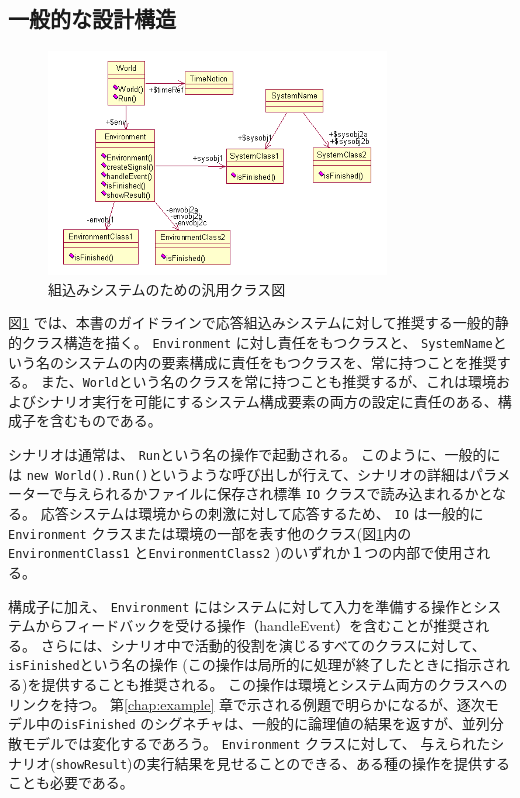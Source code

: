 \documentclass[\pformat,12pt]{jreport}
\begin{document}
\subsection{一般的な設計構造}\label{sec:typicalclassdiag}

\begin{figure}
\begin{center}
\includegraphics[width=0.8\textwidth]{generalclassdiag}
\end{center}
\caption{組込みシステムのための汎用クラス図}\label{fig:classdiag}
\end{figure}

図\ref{fig:classdiag} では、本書のガイドラインで応答組込みシステムに対して推奨する一般的静的クラス構造を描く。
\texttt{Environment} に対し責任をもつクラスと、 \texttt{SystemName}という名のシステムの内の要素構成に責任をもつクラスを、常に持つことを推奨する。
また、\texttt{World}という名のクラスを常に持つことも推奨するが、これは環境およびシナリオ実行を可能にするシステム構成要素の両方の設定に責任のある、構成子を含むものである。

シナリオは通常は、 \texttt{Run}という名の操作で起動される。
このように、一般的には \texttt{new World().Run()}というような呼び出しが行えて、シナリオの詳細はパラメーターで与えられるかファイルに保存され標準 \texttt{IO} クラスで読み込まれるかとなる。
応答システムは環境からの刺激に対して応答するため、 \texttt{IO} は一般的に \texttt{Environment} クラスまたは環境の一部を表す他のクラス(図\ref{fig:classdiag}内の\texttt{EnvironmentClass1} と\texttt{EnvironmentClass2} )のいずれか１つの内部で使用される。

構成子に加え、 \texttt{Environment} にはシステムに対して入力を準備する操作とシステムからフィードバックを受ける操作（handleEvent）を含むことが推奨される。
さらには、シナリオ中で活動的役割を演じるすべてのクラスに対して、 \texttt{isFinished}という名の操作 (この操作は局所的に処理が終了したときに指示される)を提供することも推奨される。
この操作は環境とシステム両方のクラスへのリンクを持つ。
第\ref{chap:example} 章で示される例題で明らかになるが、逐次モデル中の\texttt{isFinished} のシグネチャは、一般的に論理値の結果を返すが、並列分散モデルでは変化するであろう。
 \texttt{Environment} クラスに対して、
 与えられたシナリオ(\texttt{showResult})の実行結果を見せることのできる、ある種の操作を提供することも必要である。
\end{document}
